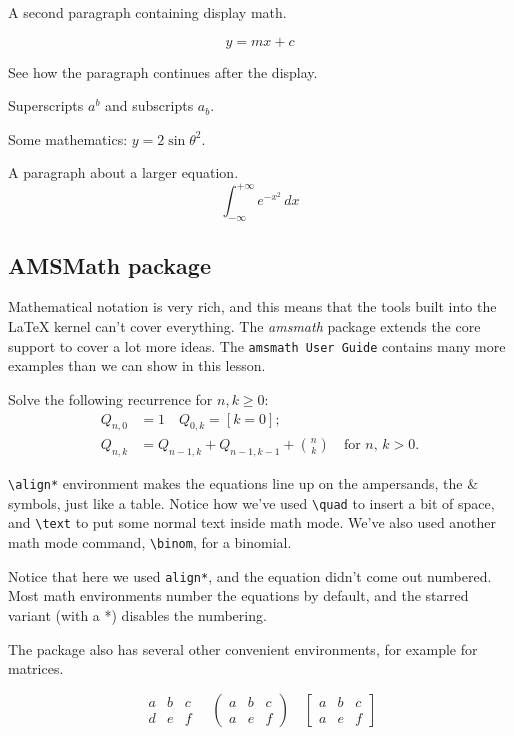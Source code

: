 \documentclass[12]{article}
\begin{document}
    A second paragraph containing display math.

    \[
        y = mx + c
    \]

    See how the paragraph continues after the display.

    Superscripts $a^{b}$ and subscripts $a_{b}$.

    Some mathematics: $y = 2 \sin \theta^{2}$.

    A paragraph about a larger equation.
    \[
        \int_{{-\infty}}^{{+\infty}} {e^{-x^2}} \, d{x}
    \]

    \subsection{AMSMath package}%
    \label{sub:amsmath-package}
    Mathematical notation is very rich, and this means that the tools built into the LaTeX kernel can’t cover everything. The \textit{amsmath} package extends the core support to cover a lot more ideas. The \texttt{amsmath User Guide} contains many more examples than we can show in this lesson.

    Solve the following recurrence for $ n,k\geq 0 $:
    \begin{align*}
        \label{eq:amsmath-equation}
        Q_{n,0} &= 1   \quad Q_{0,k} = [k=0];  \\
        Q_{n,k} &= Q_{n-1,k}+Q_{n-1,k-1}+\binom{n}{k} \quad\text{for $n$, $k>0$.}
    \end{align*}

    \verb|\align*| environment makes the equations line up on the ampersands, the \& symbols, just like a table. Notice how we’ve used \verb|\quad| to insert a bit of space, and \verb|\text| to put some normal text inside math mode. We’ve also used another math mode command, \verb|\binom|, for a binomial.

    Notice that here we used \verb|align*|, and the equation didn’t come out numbered. Most math environments number the equations by default, and the starred variant (with a *) disables the numbering.

    The package also has several other convenient environments, for example for matrices.

    \[
    \begin{matrix}
        a & b & c \\
        d & e & f
    \end{matrix}
    \quad
    \begin{pmatrix}
    a & b & c \\
    a & e & f
    \end{pmatrix}
    \quad
    \begin{bmatrix}
    a & b & c \\
    a & e & f
    \end{bmatrix}
    \]
\end{document}
